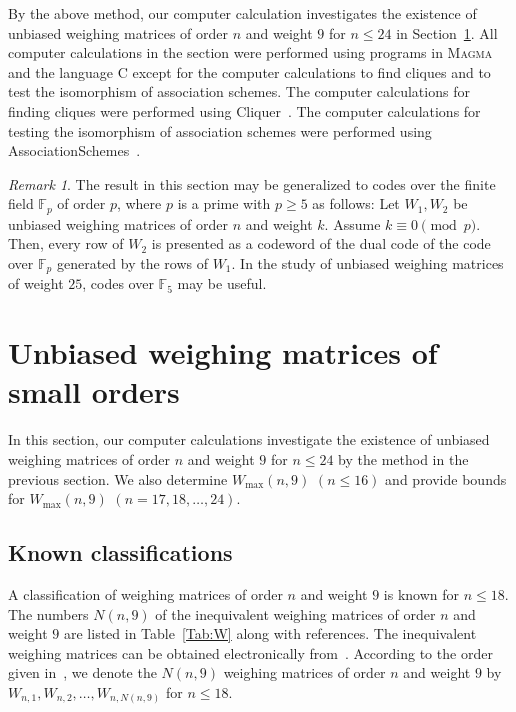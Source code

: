 \documentclass[12pt]{article}
\theoremstyle{remark}
\newtheorem{rem}[thm]{Remark}
\newcommand{\FF}{\mathbb{F}}
\begin{document}
By the above method, our computer calculation investigates the existence of 
 unbiased weighing matrices of order $n$ and weight $9$ for $n \le 24$
in Section~\ref{Sec:small}.
All computer calculations in the section
were performed using programs in \textsc{Magma}~\cite{Magma} and the language \textsc{C}
except for the computer calculations to find cliques
and to test the isomorphism of association schemes.
The computer calculations for finding cliques
were performed using {\sc Cliquer}~\cite{Cliquer}.
The computer calculations for testing the isomorphism of association schemes
were performed using {\sc AssociationSchemes}~\cite{GAPAS}.


\begin{rem}
The result in this section may be generalized to codes over the
finite field $\FF_p$ of order $p$, where $p$ is a prime with $p \ge 5$ as follows:
Let $W_1, W_2$ be unbiased weighing matrices of order $n$ and weight $k$.
Assume $k \equiv 0 \pmod p$.
Then, every row of $W_2$ is presented as a codeword of the dual code of
the code over $\FF_p$ generated by the rows of $W_1$.
In the study of unbiased weighing matrices of weight $25$,
codes over $\FF_5$ may be useful.
\end{rem}


\section{Unbiased weighing matrices of small orders}
\label{Sec:small}

In this section,
our computer calculations investigate the existence of 
unbiased weighing matrices of order $n$ and weight $9$ for $n \le 24$
by the method in the previous section.
We also determine $W_{\max}(n,9)$ $(n \le 16)$ and 
provide bounds for $W_{\max}(n,9)$ $(n=17,18,\ldots,24)$.

\subsection{Known classifications}

A classification of weighing matrices of order $n$ and weight $9$ is known
for $n \le 18$.
The numbers $N(n,9)$ of the inequivalent weighing matrices of order $n$ and weight $9$
are listed in Table~\ref{Tab:W} along with references.
The inequivalent weighing matrices can be obtained electronically from~\cite{Data}.
According to the order given in~\cite{Data}, we denote the 
$N(n,9)$ weighing matrices of order $n$ and weight $9$
by $W_{n,1}, W_{n,2}, \ldots,W_{n,N(n,9)}$ for $n \le 18$.
\end{document}
